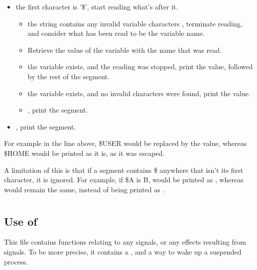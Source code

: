 \documentclass[12pt, a4paper]{report}
\begin{document}
                \begin{itemize}
                    \item {} the first character is '\$', start reading what's after it.
                        \begin{itemize}
                            \item {} the string contains any invalid variable characters
                                ,
                                terminate reading, and consider what has been read to be
                                the variable name.
                            \item Retrieve the value of the variable with the name that
                                was read.
                            \item {} the variable exists, and the reading was stopped,
                                print the value, followed by the rest of the segment.
                            \item {} the variable exists, and no invalid characters were
                                found, print the value.
                            \item {}, print the segment.
                        \end{itemize}
                    \item {}, print the segment.
                \end{itemize}

                For example in the line above, \$USER would be replaced by the value,
                whereas \$HOME would be printed as it is, as it was escaped.

                A limitation of this is that if a segment contains \$ anywhere that isn't
                its first character, it is ignored. For example, if \$A is B, 
                would be printed as , whereas  would remain
                the same, instead of being printed as .

                \clearpage
            
        \section{}
            \subsection{Use of }
                This file contains functions relating to any signals, or any effects
                resulting from signals. To be more precise, it contains a ,
                and a way to wake up a suspended process.
\end{document}
